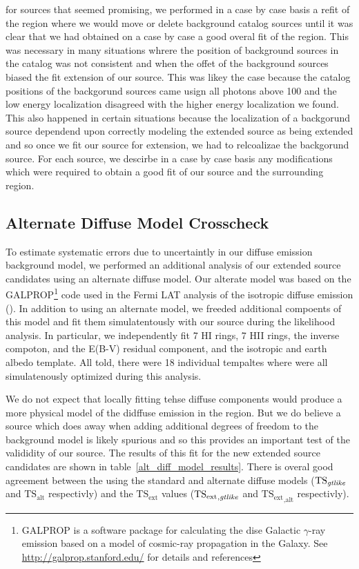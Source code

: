 \documentclass[12pt,preprint]{aastex}
\newcommand{\mev}{\text{MeV}\xspace}
\newcommand{\tsext}{{\ensuremath{\text{TS}_\text{ext}}}\xspace}
\newcommand{\tsextgtlike}{\ensuremath{\tsext_{,\gtlike}}\xspace}
\newcommand{\tsextalt}{\ensuremath{\tsext_{,\alt}}\xspace}
\newcommand{\ts}{\text{TS}\xspace}
\newcommand{\alt}{\text{alt}\xspace}
\newcommand{\gtlike}{\text{\em gtlike}\xspace}
\begin{document}
for sources that seemed promising, we performed in a case
by case basis a refit of the region where we would move or delete
background catalog sources until it was clear that we had obtained on
a case by case a good overal fit of the region. This was necessary in
many situations whrere the position of background sources in the catalog
was not consistent and when the offet of the background sources biased
the fit extension of our source. This was likey the case because the
catalog positions of the backgorund sources came usign all photons above
100 \mev and the low energy localization disagreed with the higher energy
localization we found. This also happened in certain situations because
the localization of a backgorund source dependend upon correctly modeling
the extended source as being extended and so once we fit our source for
extension, we had to relcoalizae the backgorund source.  For each source,
we descirbe in a case by case basis any modifications which were required
to obtain a good fit of our source and the surrounding region.

\subsection{Alternate Diffuse Model Crosscheck}
\label{alt_diff_model_description}

To estimate systematic errors due to uncertaintly in our diffuse
emission background model, we performed an additional analysis
of our extended source candidates using an alternate diffuse
model. Our alterate model was based on the GALPROP\footnote{GALPROP
is a software package for calculating the dise Galactic $\gamma$-ray
emission based on a model of cosmic-ray propagation in the Galaxy. See
\url{http://galprop.stanford.edu/} for details and references} code
used in the Fermi LAT analysis of the isotropic diffuse emission
(\cite{isotropic_lat}).  In addition to using an alternate model, we
freeded additional compoents of this model and fit them simulatentously
with our source during the likelihood analysis. In particular,
we independently fit 7 HI rings, 7 HII rings, the inverse compoton,
and the E(B-V) residual component, and the isotropic and earth albedo
template. All told, there were 18 individual tempaltes where were all
simulatenously optimized during this analysis.

We do not expect that locally fitting tehse diffuse components would
produce a more physical model of the didffuse emission in the region.
But we do believe a source which does away when adding additional
degrees of freedom to the background model is likely spurious and so
this provides an important test of the valididity of our source.
The results of this fit for the new extended source candidates are
shown in table~\ref{alt_diff_model_results}. There is overal
good agreement between the \ts using the standard and alternate diffuse
models ($\ts_\gtlike$ and $\ts_\alt$ respectivly) and the \tsext values
(\tsextgtlike and \tsextalt respectivly).
\end{document}
